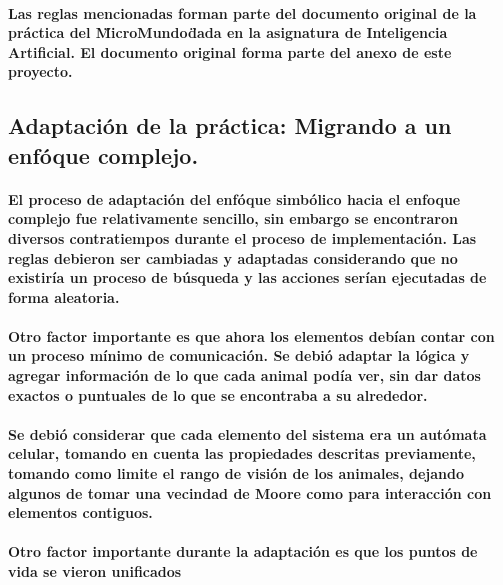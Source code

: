   \paragraph{Las reglas mencionadas forman parte del documento original de la práctica del \"MicroMundo\" dada en la asignatura de Inteligencia Artificial. El documento original forma parte del anexo de este proyecto.\cite{9}}
\subsection{Adaptación de la práctica: Migrando a un enfóque complejo.}
  \paragraph{El proceso de adaptación del enfóque simbólico hacia el enfoque complejo fue relativamente sencillo, sin embargo se encontraron diversos contratiempos durante el proceso de implementación. Las reglas debieron ser cambiadas y adaptadas considerando que no existiría un proceso de búsqueda y las acciones serían ejecutadas de forma aleatoria.}
  \paragraph{Otro factor importante es que ahora los elementos debían contar con un proceso mínimo de comunicación. Se debió adaptar la lógica y agregar información de lo que cada animal podía ver, sin dar datos exactos o puntuales de lo que se encontraba a su alrededor.}
  \paragraph{Se debió considerar que cada elemento del sistema era un autómata celular, tomando en cuenta las propiedades descritas previamente, tomando como limite el rango de visión de los animales, dejando algunos de tomar una vecindad de Moore como para interacción con elementos contiguos.}
  \paragraph{Otro factor importante durante la adaptación es que los puntos de vida se vieron unificados }